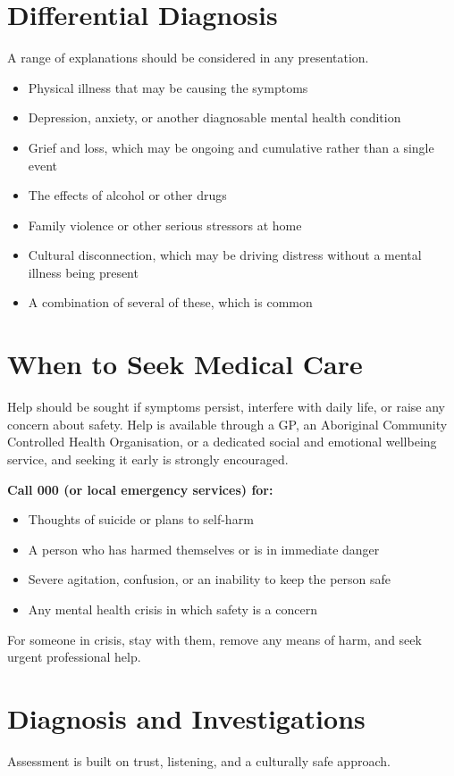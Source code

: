 \section*{Differential Diagnosis}
A range of explanations should be considered in any presentation.

\begin{itemize}
    \item Physical illness that may be causing the symptoms
    \item Depression, anxiety, or another diagnosable mental health condition
    \item Grief and loss, which may be ongoing and cumulative rather than a single event
    \item The effects of alcohol or other drugs
    \item Family violence or other serious stressors at home
    \item Cultural disconnection, which may be driving distress without a mental illness being present
    \item A combination of several of these, which is common
\end{itemize}

\section*{When to Seek Medical Care}
Help should be sought if symptoms persist, interfere with daily life, or raise any concern about safety. Help is available through a GP, an Aboriginal Community Controlled Health Organisation, or a dedicated social and emotional wellbeing service, and seeking it early is strongly encouraged.

\textbf{Call 000 (or local emergency services) for:}
\begin{itemize}
    \item Thoughts of suicide or plans to self-harm
    \item A person who has harmed themselves or is in immediate danger
    \item Severe agitation, confusion, or an inability to keep the person safe
    \item Any mental health crisis in which safety is a concern
\end{itemize}

For someone in crisis, stay with them, remove any means of harm, and seek urgent professional help.

\section*{Diagnosis and Investigations}
Assessment is built on trust, listening, and a culturally safe approach.

